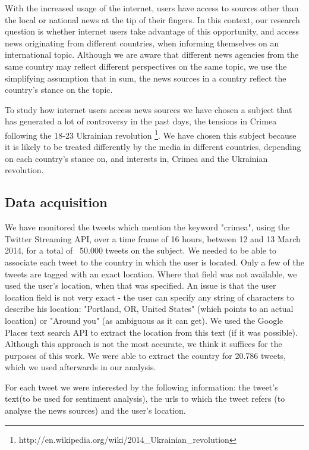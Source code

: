 \documentclass{acm_proc_10ptArticle-sp}
\begin{document}
With the increased usage of the internet, users have access to sources other than the local or national news at the tip of their fingers. In this context, our research question is whether internet users take advantage of this opportunity, and access news originating from different countries, when informing themselves on an international topic. Although we are aware that different news agencies from the same country may reflect different perspectives on the same topic, we use the simplifying assumption that in sum, the news sources in a country reflect the country's stance on the topic.

To study how internet users access news sources we have chosen a subject that has generated a lot of controversy in the past days, the tensions in Crimea following the 18-23 Ukrainian revolution \footnote{http://en.wikipedia.org/wiki/2014\_Ukrainian\_revolution}. We have chosen this subject because it is likely to be treated differently by the media in different countries, depending on each country's stance on, and interests in, Crimea and the Ukrainian revolution.

\subsection{Data acquisition}

We have monitored the tweets which mention the keyword "crimea", using the Twitter Streaming API, over a time frame of 16 hours, between 12 and 13 March 2014, for a total of ~50.000 tweets on the subject. We needed to be able to associate each tweet to the country in which the user is located. Only a few of the tweets are tagged with an exact location. Where that field was not available, we used the user's location, when that was specified. An issue is that the user location field is not very exact - the user can specify any string of characters to describe his location: "Portland, OR, United States" (which points to an actual location) or "Around you" (as ambiguous as it can get). We used the Google Places text search API to extract the location from this text (if it was possible). Although this approach is not the most accurate, we think it suffices for the purposes of this work. We were able to extract the country for 20.786 tweets, which we used afterwards in our analysis.

For each tweet we were interested by the following information: the tweet's text(to be used for sentiment analysis), the urls to which the tweet refers (to analyse the news sources) and the user's location. 
\end{document}
